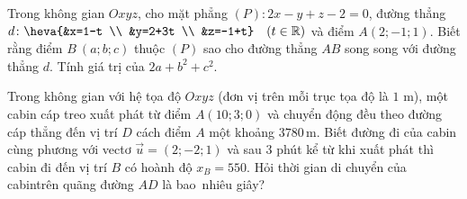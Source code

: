 \begin{bt}%
	Trong không gian $Oxyz$, cho mặt phẳng $(P)\colon 2x-y+z-2=0$, đường thẳng $d\colon\heva{&x=1-t \\ &y=2+3t \\ &z=-1+t} \quad(t \in \mathbb{R})$ và điểm $A(2;-1; 1)$. Biết  rằng điểm $B\ (a; b; c)$ thuộc $(P)$ sao cho đường thẳng $AB$ song song với đường thẳng $d$. Tính giá trị của $2a+b^2+c^2$.
\end{bt}

\begin{bt}%
	Trong không gian với hệ tọa độ $Oxyz$ (đơn vị trên mỗi trục tọa độ là $1$ m), một cabin cáp treo xuất phát từ điểm $A(10;3;0)$ và chuyển động đều theo đường cáp thẳng đến vị trí $D$ cách điểm $A$ một khoảng $3780$\,m.  Biết đường đi của cabin cùng phương với vectơ $\overrightarrow{u}=(2;-2;1)$ và sau $3$ phút kể từ khi xuất phát thì cabin đi đến vị trí $B$ có hoành độ $x_B=550$. Hỏi thời gian di chuyển của cabintrên quãng đường $AD$ là bao~nhiêu giây?
\end{bt}


